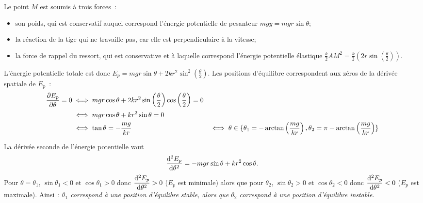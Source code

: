 Le point $M$ est soumis à trois forces~:
\begin{itemize}
\item son poids, qui est conservatif auquel correspond l'énergie potentielle de pesanteur $mgy=mgr\sin\theta$;
\item la réaction de la tige qui ne travaille pas, car elle est perpendiculaire à la vitesse;
\item la force de rappel du ressort, qui est conservative et à laquelle correspond l'énergie potentielle élastique $\frac{k}{2}AM^2=\frac{k}{2}\left(2r\sin\left(\frac{\theta}{2}\right)\right)$.
\end{itemize}

L'énergie potentielle totale est donc $E_p = mgr \sin\theta + 2kr^2 \sin^2\left(\frac{\theta}{2}\right)$. Les positions d'équilibre correspondent aux zéros de la dérivée spatiale de $E_p$~:
\begin{align}
  \dfrac{\partial E_p}{\partial \theta} = 0 &\iff mgr\cos\theta +2kr^2 \sin\left(\frac{\theta}{2}\right) \cos\left(\frac{\theta}{2}\right)=0 \\
  & \iff mgr\cos\theta + kr^2 \sin\theta=0 \\
  & \iff \tan\theta = -\frac{mg}{kr}
  & \iff \theta \in \{\theta_1=-\arctan \left( \frac{mg}{kr} \right), \theta_2=\pi-\arctan \left( \frac{mg}{kr} \right)\}
\end{align}

La dérivée seconde de l'énergie potentielle vaut
\begin{equation}
  \dfrac{\mathrm{d}^2 E_p}{\mathrm{d} {\theta}^2} = -mgr\sin\theta +kr^2\cos\theta.
\end{equation}
Pour $\theta=\theta_1$, $\sin\theta_1<0$ et $\cos\theta_1>0$ donc $\dfrac{\mathrm{d}^2 E_p}{\mathrm{d} {\theta}^2}>0$ ($E_p$ est minimale) alors que pour $\theta_2$, $\sin\theta_2>0$ et $\cos\theta_2<0$ donc $\dfrac{\mathrm{d}^2 E_p}{\mathrm{d} {\theta}^2}<0$ ($E_p$ est maximale). Ainsi~: \emph{$\theta_1$ correspond à une position d'équilibre stable, alors que $\theta_2$ correspond à une position d'équilibre instable.}

